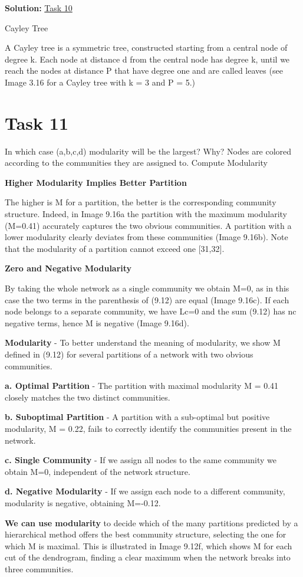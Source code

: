 \documentclass{cernatsnote}
\begin{document}
\par \textbf{Solution:} \href{http://networksciencebook.com/chapter/3#advanced-a}{Task 10}
\par Cayley Tree
\par A Cayley tree is a symmetric tree, constructed starting from a central node of degree k. Each node at distance d from the central node has degree k, until we reach the nodes at distance P that have degree one and are called leaves (see Image 3.16 for a Cayley tree with k = 3 and P = 5.)
\section{Task 11} 
In which case (a,b,c,d) modularity will be the largest? Why? Nodes are colored according to the communities they are assigned to. Compute Modularity

\textbf{Higher Modularity Implies Better Partition} 

\par The higher is M for a partition, the better is the corresponding community structure. Indeed, in Image 9.16a the partition with the maximum modularity (M=0.41) accurately captures the two obvious communities. A partition with a lower modularity clearly deviates from these communities (Image 9.16b). Note that the modularity of a partition cannot exceed one [31,32].

\textbf{Zero and Negative Modularity}

\par By taking the whole network as a single community we obtain M=0, as in this case the two terms in the parenthesis of (9.12) are equal (Image 9.16c). If each node belongs to a separate community, we have Lc=0 and the sum (9.12) has nc negative terms, hence M is negative (Image 9.16d).

\par \textbf{Modularity} - To better understand the meaning of modularity, we show M defined in (9.12) for several partitions of a network with two obvious communities.

\par \textbf{a.	Optimal Partition} - The partition with maximal modularity M = 0.41 closely matches the two distinct communities.
\par \textbf{b.	Suboptimal Partition} - A partition with a sub-optimal but positive modularity, M = 0.22, fails to correctly identify the communities present in the network.
\par \textbf{c.	Single Community} - If we assign all nodes to the same community we obtain M=0, independent of the network structure.
\par \textbf{d.	Negative Modularity} - If we assign each node to a different community, modularity is negative, obtaining M=-0.12.
\par \textbf{We can use modularity} to decide which of the many partitions predicted by a hierarchical method offers the best community structure, selecting the one for which M is maximal. This is illustrated in Image 9.12f, which shows M for each cut of the dendrogram, finding a clear maximum when the network breaks into three communities.
\end{document}
